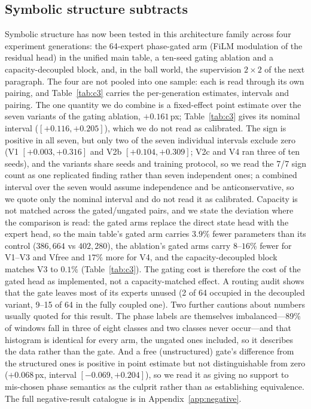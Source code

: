 \documentclass{article}
\begin{document}
\subsection{Symbolic structure subtracts}

Symbolic structure has now been tested in this architecture family across four experiment generations: the 64-expert phase-gated arm (FiLM modulation of the residual head) in the unified main table, a ten-seed gating ablation and a capacity-decoupled block, and, in the ball world, the supervision $2\times2$ of the next paragraph. The four are not pooled into one sample: each is read through its own pairing, and Table~\ref{tab:c3} carries the per-generation estimates, intervals and pairing. The one quantity we do combine is a fixed-effect point estimate over the seven variants of the gating ablation, $+0.161$\,px; Table~\ref{tab:c3} gives its nominal interval ($[+0.116, +0.205]$), which we do not read as calibrated. The sign is positive in all seven, but only two of the seven individual intervals exclude zero (V1 $[+0.003, +0.316]$ and V2b $[+0.104, +0.309]$; V2c and V4 ran three of ten seeds), and the variants share seeds and training protocol, so we read the 7/7 sign count as one replicated finding rather than seven independent ones; a combined interval over the seven would assume independence and be anticonservative, so we quote only the nominal interval and do not read it as calibrated. Capacity is not matched across the gated/ungated pairs, and we state the deviation where the comparison is read: the gated arms replace the direct state head with the expert head, so the main table's gated arm carries $3.9\%$ fewer parameters than its control ($386{,}664$ vs $402{,}280$), the ablation's gated arms carry $8$--$16\%$ fewer for V1--V3 and Vfree and $17\%$ more for V4, and the capacity-decoupled block matches V3 to $0.1\%$ (Table~\ref{tab:c3}). The gating cost is therefore the cost of the gated head as implemented, not a capacity-matched effect. A routing audit shows that the gate leaves most of its experts unused (2 of 64 occupied in the decoupled variant, 9--15 of 64 in the fully coupled one). Two further cautions about numbers usually quoted for this result. The phase labels are themselves imbalanced---89\% of windows fall in three of eight classes and two classes never occur---and that histogram is identical for every arm, the ungated ones included, so it describes the data rather than the gate. And a free (unstructured) gate's difference from the structured ones is positive in point estimate but not distinguishable from zero ($+0.068$\,px, interval $[-0.069, +0.204]$), so we read it as giving no support to mis-chosen phase semantics as the culprit rather than as establishing equivalence. The full negative-result catalogue is in Appendix~\ref{app:negative}.
\end{document}
